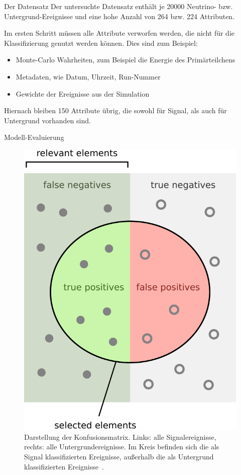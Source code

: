 \documentclass[t]{beamer}
\begin{document}
\begin{columns}[onlytextwidth]
\begin{column}{0.5\textwidth}
      \begin{block}{Der Datensatz}
      Der untersuchte Datensatz enthält je \num{20000} Neutrino- bzw. Untergrund-Ereignisse
      und eine hohe Anzahl von 264 bzw. 224 Attributen.

      Im ersten Schritt müssen alle Attribute verworfen werden, die nicht für
      die Klassifizierung genutzt werden können.
      Dies sind zum Beispiel:
      \begin{itemize}
        \item Monte-Carlo Wahrheiten, zum Beispiel die Energie des Primärteilchens
        \item Metadaten, wie Datum, Uhrzeit, Run-Nummer
        \item Gewichte der Ereignisse aus der Simulation
      \end{itemize}

      Hiernach bleiben 150 Attribute übrig, die sowohl für Signal, als auch für
      Untergrund vorhanden sind.
      \end{block}

      \begin{block}{Modell-Evaluierung}
        \begin{multicols}{2}
          \begin{figure}
            \centering
            \includegraphics[width=0.9\linewidth]{images/precisionrecall-crop.pdf}
            \caption{Darstellung der Konfusionsmatrix. Links: alle Signalereignisse,
            rechts: alle Untergrundereignisse. Im Kreis befinden sich die als Signal klassifizierten Ereignisse,
            außerhalb die als Untergrund klassifizierten Ereignisse~\cite{recall_precission_pic}.}
          \end{figure}
          \columnbreak


\end{multicols}
\end{block}
\end{column}
\end{columns}
\end{document}
